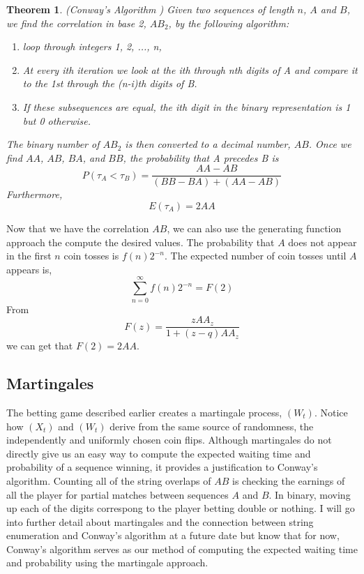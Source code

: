 \documentclass{article}
\newtheorem{theorem}{Theorem}[section]
\numberwithin{mytheorem}{subsection} %
\begin{document}
			\begin{theorem}(Conway's Algorithm \cite{gardner})
			Given two sequences of length $n$, $A$ and $B$, we find the correlation in base 2, $AB_2$, by the following algorithm:
			\begin{enumerate}
			\item loop through integers 1, 2, ..., n,
			\item At every ith iteration we look at the ith through nth digits of A and compare
			   it to the 1st through the (n-i)th digits of B.
			\item If these subsequences are equal, the ith digit in the binary representation is 1 but 0 otherwise.
			\end{enumerate} 

			The binary number of $AB_2$
			is then converted to a decimal number, $AB$. Once we find $AA$, $AB$,
			$BA$, and $BB$, the probability that A precedes B is
			$$P(\tau_A < \tau_B) = \frac{AA - AB}{(BB - BA) + (AA - AB)} $$
			Furthermore, 
			$$E(\tau_A) = 2AA $$ 
			\end{theorem}

			Now that we have the correlation $AB$, we can also use the generating function approach the compute the desired values. The probability that $A$ does not appear in the first $n$ coin tosses is $f(n)2^{-n}$. The expected number of coin tosses until $A$ appears is,
			$$\sum_{n=0}^\infty f(n) 2^{-n} = F(2)$$
			From 
			$$F(z) = \frac{zAA_z}{1+(z-q)AA_z}$$
			we can get that $F(2) = 2AA$. \cite{enumerate} \cite{gardner}
		\subsection{Martingales}
			The betting game described earlier creates a martingale process, $(W_t)$. Notice how $(X_t)$ and $(W_t)$ derive from the same source of randomness, the independently and uniformly chosen coin flips. Although martingales do not directly give us an easy way to compute the expected waiting time and probability of a sequence winning, it provides a justification to Conway's algorithm. Counting all of the string overlaps of $AB$ is checking the earnings of all the player for partial matches between sequences $A$ and $B$. In binary, moving up each of the digits correspong to the player betting double or nothing. I will go into further detail about martingales and the connection between string enumeration and Conway's algorithm at a future date but know that for now, Conway's algorithm serves as our method of computing the expected waiting time and probability using the martingale approach.
\end{document}
